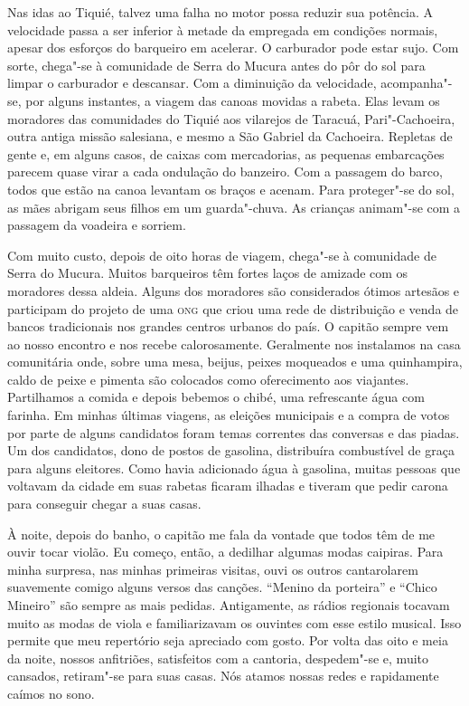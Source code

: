 Nas idas ao Tiquié, talvez uma falha no motor possa reduzir sua
potência. A velocidade passa a ser inferior à metade da empregada em
condições normais, apesar dos esforços do barqueiro em acelerar. O
carburador pode estar sujo. Com sorte, chega"-se à comunidade de Serra do
Mucura antes do pôr do sol para limpar o carburador e descansar. Com a
diminuição da velocidade, acompanha"-se, por alguns instantes, a viagem
das canoas movidas a rabeta. Elas levam os moradores das comunidades do
Tiquié aos vilarejos de Taracuá, Pari"-Cachoeira, outra antiga missão
salesiana, e mesmo a São Gabriel da Cachoeira. Repletas de gente e, em
alguns casos, de caixas com mercadorias, as pequenas embarcações parecem
quase virar a cada ondulação do banzeiro. Com a passagem do barco, todos
que estão na canoa levantam os braços e acenam. Para proteger"-se do sol,
as mães abrigam seus filhos em um guarda"-chuva. As crianças animam"-se
com a passagem da voadeira e sorriem.

Com muito custo, depois de oito horas de viagem, chega"-se à comunidade
de Serra do Mucura. Muitos barqueiros têm fortes laços de amizade com os
moradores dessa aldeia. Alguns dos moradores são considerados ótimos
artesãos e participam do projeto de uma {\textsc{ong}} que criou uma rede de
distribuição e venda de bancos tradicionais nos grandes centros urbanos
do país. O capitão sempre vem ao nosso encontro e nos recebe
calorosamente. Geralmente nos instalamos na casa comunitária onde, sobre
uma mesa, beijus, peixes moqueados e uma quinhampira, caldo de peixe e
pimenta são colocados como oferecimento aos viajantes. Partilhamos a
comida e depois bebemos o chibé, uma refrescante água com farinha. Em
minhas últimas viagens, as eleições municipais e a compra de votos por
parte de alguns candidatos foram temas correntes das conversas e das
piadas. Um dos candidatos, dono de postos de gasolina, distribuíra
combustível de graça para alguns eleitores. Como havia adicionado água à
gasolina, muitas pessoas que voltavam da cidade em suas rabetas ficaram
ilhadas e tiveram que pedir carona para conseguir chegar a suas casas.

À noite, depois do banho, o capitão me fala da vontade que todos têm de
me ouvir tocar violão. Eu começo, então, a dedilhar algumas modas
caipiras. Para minha surpresa, nas minhas primeiras visitas, ouvi os
outros cantarolarem suavemente comigo alguns versos das canções.
``Menino da porteira'' e ``Chico Mineiro'' são sempre as mais pedidas.
Antigamente, as rádios regionais tocavam muito as modas de viola e
familiarizavam os ouvintes com esse estilo musical. Isso permite que meu
repertório seja apreciado com gosto. Por volta das oito e meia da noite, nossos
anfitriões, satisfeitos com a cantoria, despedem"-se e, muito cansados,
retiram"-se para suas casas. Nós atamos nossas redes e rapidamente caímos
no sono.

